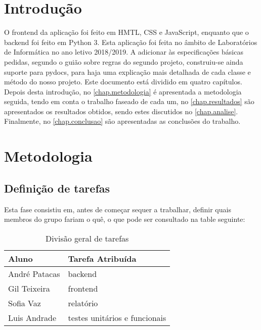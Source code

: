 \documentclass{report}
\begin{document}
\clearpage
{}

\chapter{Introdução}
\label{chap.introducao}

O frontend da aplicação foi feito em HMTL, CSS e JavaScript, enquanto que o backend foi feito em Python 3. Esta aplicação foi feita no âmbito de Laboratórios de Informática no ano letivo 2018/2019.
A adicionar às especificações básicas pedidas, segundo o guião sobre regras do segundo projeto, construiu-se ainda suporte para pydocs, para haja uma explicação mais detalhada de cada classe e método do nosso projeto.
Este documento está dividido em quatro capítulos.
Depois desta introdução,
no \autoref{chap.metodologia} é apresentada a metodologia seguida, tendo em conta o trabalho faseado de cada um, 
no \autoref{chap.resultados} são apresentados os resultados obtidos,
sendo estes discutidos no \autoref{chap.analise}.
Finalmente, no \autoref{chap.conclusao} são apresentadas
as conclusões do trabalho.

\chapter{Metodologia}
\label{chap.metodologia}
\section{Definição de tarefas}
Esta fase consistiu em, antes de começar sequer a trabalhar, definir quais membros do grupo fariam o quê, o que pode ser consultado na table seguinte: 
\begin{table}[h!]
\begin{center}
\caption{Divisão geral de tarefas}
\label{tab:table1}
\begin{tabular}{l|l}
\hline
\multicolumn{1}{|l|}{Aluno} & \multicolumn{1}{l|}{Tarefa Atribuída} \\ \hline
            André Patacas   & backend                               \\ 
            Gil Teixeira      & frontend                               \\
            Sofia Vaz         & relatório                                \\
            Luis Andrade    & testes unitários e funcionais                     
\end{tabular}
\end{center}
\end{table}
\end{document}
